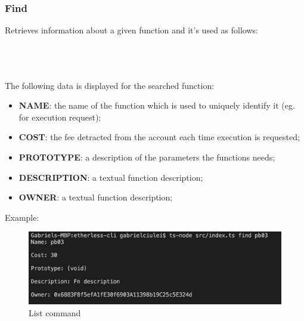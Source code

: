 \subsubsection{Find}
Retrieves information about a given function and it's used as follows:\\\\
\centerline {}\\\\
The following data is displayed for the searched function:
\begin{itemize}
	\item \textbf{NAME}: the name of the function which is used to uniquely identify it (eg. for execution request);
	\item \textbf{COST}: the fee detracted from the account each time execution is requested;
	\item \textbf{PROTOTYPE}: a description of the parameters the functions needs;
	\item \textbf{DESCRIPTION}: a textual function description;
	\item \textbf{OWNER}: a textual function description;
\end{itemize}
Example:
\begin{figure}[h]
	\begin{center}
	\includegraphics[width=\textwidth]{res/img/Screenshot_find.png}
	\caption{List command}
	\end{center}
\end{figure}
